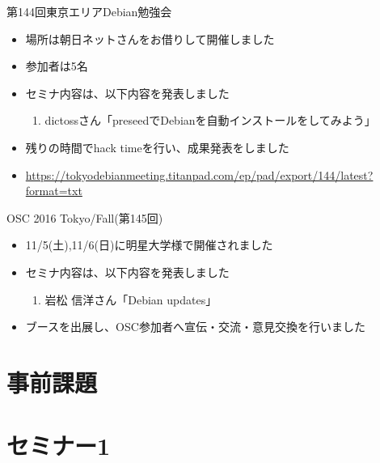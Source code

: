 \begin{frame}{第144回東京エリアDebian勉強会}

\begin{itemize}
\item 場所は朝日ネットさんをお借りして開催しました
\item 参加者は5名
\item セミナ内容は、以下内容を発表しました
  \begin{enumerate}
  \item dictossさん「preseedでDebianを自動インストールをしてみよう」
  \end{enumerate}
\item 残りの時間でhack timeを行い、成果発表をしました
\item \url{https://tokyodebianmeeting.titanpad.com/ep/pad/export/144/latest?format=txt}
\end{itemize} 
\end{frame}

\begin{frame}{OSC 2016 Tokyo/Fall(第145回)}

\begin{itemize}
\item 11/5(土),11/6(日)に明星大学様で開催されました
\item セミナ内容は、以下内容を発表しました
  \begin{enumerate}
  \item 岩松 信洋さん「Debian updates」
  \end{enumerate}
\item ブースを出展し、OSC参加者へ宣伝・交流・意見交換を行いました
\end{itemize} 
\end{frame}

\section{事前課題}
{\footnotesize
 
}

%
%

\section{セミナー1}

